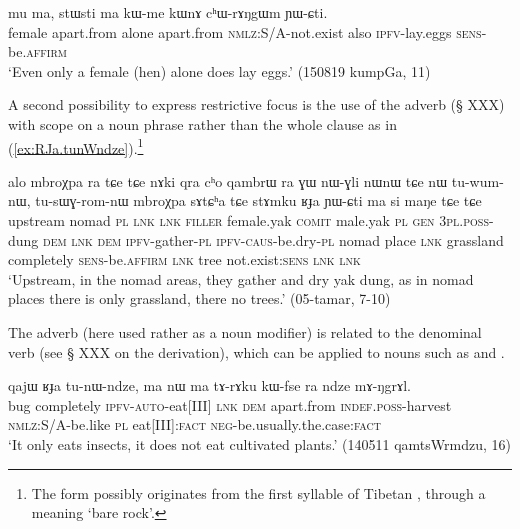   \begin{exe}
\ex \label{ex:ma.kWme.kWnA}
\gll  mu ma, stɯsti ma kɯ-me kɯnɤ cʰɯ-rɤŋgɯm ɲɯ-ɕti. \\
female apart.from alone apart.from \textsc{nmlz}:S/A-not.exist also \textsc{ipfv}-lay.eggs \textsc{sens}-be.\textsc{affirm} \\
\glt `Even only a female (hen) alone does lay eggs.' (150819 kumpGa, 11)
\end{exe}
   
A second possibility to express restrictive focus is the use of the adverb  (§ XXX) with scope on a  noun phrase rather than the whole clause as in (\ref{ex:RJa.tunWndze}).\footnote{The form  possibly originates from the first syllable of Tibetan , through a meaning `bare rock'.}  

\begin{exe}
\ex \label{ex:stAmku.RJa}
\gll alo mbroχpa ra tɕe tɕe nɤki qra cʰo qambrɯ ra ɣɯ nɯ-ɣli nɯnɯ
tɕe nɯ tu-wum-nɯ, tu-sɯɣ-rom-nɯ mbroχpa sɤtɕʰa tɕe stɤmku ʁɟa ɲɯ-ɕti ma si maŋe tɕe tɕe    \\
upstream nomad \textsc{pl} \textsc{lnk} \textsc{lnk} \textsc{filler} female.yak \textsc{comit} male.yak \textsc{pl} \textsc{gen} \textsc{3pl}.\textsc{poss}-dung \textsc{dem} \textsc{lnk} \textsc{dem} \textsc{ipfv}-gather-\textsc{pl} \textsc{ipfv}-\textsc{caus}-be.dry-\textsc{pl} nomad place \textsc{lnk} grassland completely \textsc{sens}-be.\textsc{affirm} \textsc{lnk} tree not.exist:\textsc{sens} \textsc{lnk} \textsc{lnk}  \\
\glt `Upstream, in the nomad areas, they gather and dry yak dung, as in nomad places there is only grassland, there no trees.' (05-tamar, 7-10)
\end{exe}

The adverb  (here used rather as a noun modifier) is related to the denominal verb  (see § XXX on the  derivation), which can be applied to nouns such as  and .
 
\begin{exe}
\ex \label{ex:RJa.tunWndze}
 \gll qajɯ ʁɟa tu-nɯ-ndze, ma nɯ ma tɤ-rɤku kɯ-fse ra ndze mɤ-ŋgrɤl. \\
 bug completely \textsc{ipfv}-\textsc{auto}-eat[III] \textsc{lnk} \textsc{dem} apart.from \textsc{indef}.\textsc{poss}-harvest \textsc{nmlz}:S/A-be.like \textsc{pl} eat[III]:\textsc{fact} \textsc{neg}-be.usually.the.case:\textsc{fact} \\ 
\glt `It only eats insects, it does not eat cultivated plants.' (140511 qamtsWrmdzu, 16)
\end{exe}

